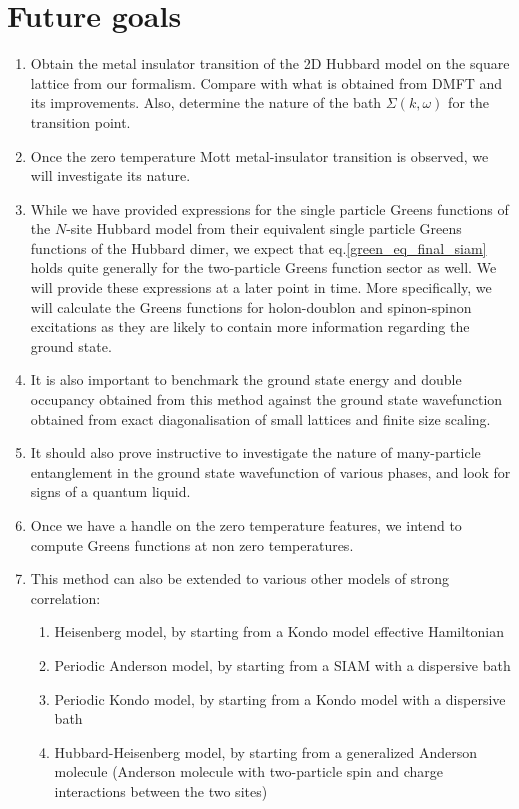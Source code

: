 \documentclass{report}
\numberwithin{equation}{section}
\begin{document}
\chapter{Future goals}
\begin{enumerate}
\item Obtain the metal insulator transition of the 2D Hubbard model on the square lattice from our formalism. Compare with what is obtained from DMFT and its improvements. Also, determine the nature of the bath $\Sigma (k,\omega)$ for the transition point.

\item Once the zero temperature Mott metal-insulator transition is observed, we will investigate its nature.

\item While we have provided expressions for the single particle Greens functions of the $N$-site Hubbard model from their equivalent single particle Greens functions of the Hubbard dimer, we expect that eq.\eqref{green_eq_final_siam} holds quite generally for the two-particle Greens function sector as well. We will provide these expressions at a later point in time. More specifically, we will calculate the Greens functions for holon-doublon and spinon-spinon excitations as they are likely to contain more information regarding the ground state.

\item It is also important to benchmark the ground state energy and double occupancy obtained from this method against the ground state wavefunction obtained from exact diagonalisation of small lattices and finite size scaling.

\item It should also prove instructive to investigate the nature of many-particle entanglement in the ground state wavefunction of various phases, and  look for signs of a quantum liquid.

\item Once we have a handle on the zero temperature features, we intend to compute Greens functions at non zero temperatures.

\item This method can also be extended to various other models of strong correlation:
	\begin{enumerate}
		\item Heisenberg model, by starting from a Kondo model effective Hamiltonian
		\item Periodic Anderson model, by starting from a SIAM with a dispersive bath
		\item Periodic Kondo model, by starting from a Kondo model with a dispersive bath
		\item Hubbard-Heisenberg model, by starting from a generalized Anderson molecule (Anderson molecule with two-particle spin and charge interactions between the two sites)
	\end{enumerate}
\end{enumerate}
\end{document}
